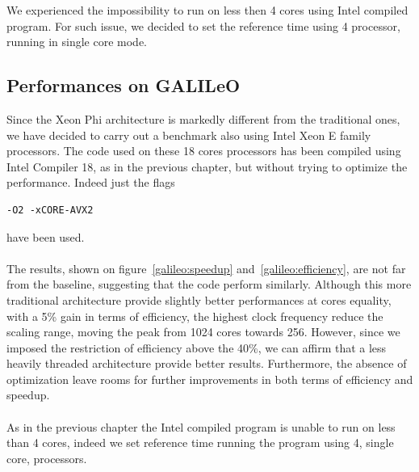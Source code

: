 We experienced the impossibility to run on less then 4 cores using Intel compiled program. For such issue, we decided to set the reference time using 4 processor, running in single core mode.


\subsection{Performances on GALILeO} \label{Galileo}
Since the Xeon Phi architecture is markedly different from the traditional ones, we have decided to carry out a benchmark also using Intel Xeon E family processors. 
The code used on these 18 cores processors has been compiled using Intel Compiler 18, as in the previous chapter, but without trying to optimize the performance. 
Indeed just the flags 
\begin{lstlisting}
-O2 -xCORE-AVX2 
\end{lstlisting}
have been used.\\~\\
The results, shown on figure~\ref{galileo:speedup} and~\ref{galileo:efficiency}, are not far from the baseline, suggesting that the code perform similarly. Although this more traditional architecture provide slightly better performances at cores equality, with a 5\% gain in terms of efficiency, the highest clock frequency reduce the scaling range, moving the peak from 1024 cores towards 256. However, since we imposed the restriction of efficiency above the 40\%, we can affirm that a less heavily threaded architecture provide better results. Furthermore, the absence of optimization leave rooms for further improvements in both terms of efficiency and speedup.\\~\\
As in the previous chapter the Intel compiled program is unable to run on less than 4 cores, indeed we set reference time running the program using 4, single core, processors.

